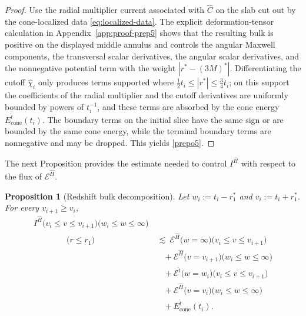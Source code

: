 \documentclass[11pt]{article}
\numberwithin{equation}{section}
\theoremstyle{plain}
\newtheorem{proposition}[theorem]{Proposition}
\theoremstyle{definition}
\theoremstyle{remark}
\begin{document}
\begin{proof}
Use the radial multiplier current associated with $\hat C$ on the slab cut out by the cone-localized data \eqref{eq:localized-data}.  The explicit deformation-tensor calculation in Appendix~\ref{app:proof-prep5} shows that the resulting bulk is positive on the displayed middle annulus and controls the angular Maxwell components, the transversal scalar derivatives, the angular scalar derivatives, and the nonnegative potential term with the weight $|r^*-(3M)^*|$.  Differentiating the cutoff $\hat\chi_i$ only produces terms supported where $\tfrac12t_i\le |r^*|\le\tfrac34t_i$; on this support the coefficients of the radial multiplier and the cutoff derivatives are uniformly bounded by powers of $t_i^{-1}$, and these terms are absorbed by the cone energy $E_{\mathrm{cone}}^{\hat t}(t_i)$.  The boundary terms on the initial slice have the same sign or are bounded by the same cone energy, while the terminal boundary terms are nonnegative and may be dropped.  This yields \eqref{prepo5}.
\end{proof}



The next Proposition provides the estimate needed to control $I^{\hat{H}}$ with respect to the flux of $\mathcal{E}^{\hat{H}}$.
\begin{proposition}[Redshift bulk decomposition]\label{prep6}
Let $w_i:=t_i-r_1^{\ast}$ and $v_i:=t_i+r_1^{\ast}$. For every $v_{i+1}\ge v_i$,
\begin{eqnarray}\label{es3}
I^{\hat H}\bigl(v_i\le v\le v_{i+1}\bigr)\bigl(w_i\le w\le \infty\bigr)\nonumber\\
\qquad\qquad\bigl(r\le r_1\bigr)
&\ \lesssim\ \mathcal E^{\hat H}\bigl(w=\infty\bigr)\bigl(v_i\le v\le v_{i+1}\bigr)\nonumber\\
&\quad+\mathcal E^{\hat H}\bigl(v=v_{i+1}\bigr)\bigl(w_i\le w\le \infty\bigr)\nonumber\\
&\quad+\mathcal E^{\hat t}\bigl(w=w_i\bigr)\bigl(v_i\le v\le v_{i+1}\bigr)\nonumber\\
&\quad+\mathcal E^{\hat H}\bigl(v=v_i\bigr)\bigl(w_i\le w\le \infty\bigr)\nonumber\\
&\quad+E^{\hat t}_{\mathrm{cone}}(t_i).
\end{eqnarray}
\end{proposition}
\end{document}
